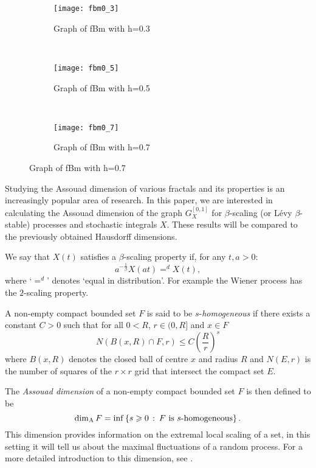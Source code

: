 \begin{figure}[h]
	\centering
	\begin{subfigure}[b]{0.3\textwidth}
		\texttt{[image: fbm0\_3]}
		\caption{Graph of fBm with h=0.3}
		\label{fig:fbm3}
	\end{subfigure}
	~ %
	\begin{subfigure}[b]{0.3\textwidth}
		\texttt{[image: fbm0\_5]}
		\caption{Graph of fBm with h=0.5}
		\label{fig:fbm5}
	\end{subfigure}
	~ %
	\begin{subfigure}[b]{0.3\textwidth}
		\texttt{[image: fbm0\_7]}
		\caption{Graph of fBm with h=0.7}
		\label{fig:fbm7}
	\end{subfigure}
\end{figure}



Studying the Assouad dimension of various fractals and its properties is an increasingly popular area of research. In this paper, we are interested in calculating the Assouad dimension of the graph $G_X^{[0,1]}$ for $\beta$-scaling (or L\'{e}vy $\beta$-stable) processes and stochastic integrals $X$. These results will be compared to the previously obtained Hausdorff dimensions.

We say that $X(t)$ satisfies a $\beta$-scaling property if, for any $t,a>0$:
\[
a^{-\frac{1}{\beta}}X(at)=^d X(t),
\]
where `$=^d$' denotes `equal in distribution'.
For example the Wiener process has the $2$-scaling property.

A non-empty compact bounded set $F$ is said to be $s$-\textit{homogeneous} if there exists a constant $C>0$ such that for all $0<R$, $r\in (0,R]$ and $x\in F$
\[
N(B(x,R) \cap F, r) \le C\left(\frac{R}{r}\right)^s
\]
where $B(x,R)$ denotes the closed ball of centre $x$ and radius $R$ and $N(E,r)$ is the number of squares of the $r\times r$ grid that intersect the compact set $E$. 

The \emph{Assouad dimension} of a non-empty compact bounded set $F$ is then defined to be 
\[
\dim_{\textup{A}} F = \inf \left\{ s \geqslant 0 \, \, \colon \, F \text{ is } s\text{-homogeneous} \right\}.
\]
This dimension provides information on the extremal local scaling of a set, in this setting it will tell us about the maximal fluctuations of a random process. For a more detailed introduction to this dimension, see \cite{Fr, Ro}. 


